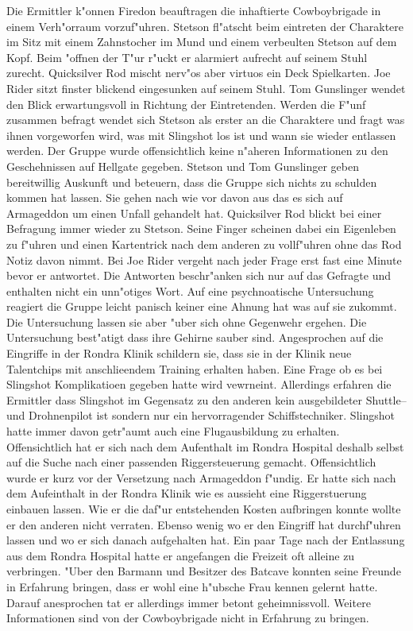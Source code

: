 
Die Ermittler k"onnen Firedon beauftragen die inhaftierte Cowboybrigade in einem Verh"orraum vorzuf"uhren. Stetson fl"atscht beim eintreten der Charaktere im Sitz mit einem Zahnstocher im Mund und einem verbeulten Stetson auf dem Kopf. Beim "offnen der T"ur r"uckt er alarmiert aufrecht auf seinem Stuhl zurecht. Quicksilver Rod mischt nerv"os aber virtuos ein Deck Spielkarten. Joe Rider sitzt finster blickend eingesunken auf seinem Stuhl. Tom Gunslinger wendet den Blick erwartungsvoll in Richtung der Eintretenden. Werden die F"unf zusammen befragt wendet sich Stetson als erster an die Charaktere und fragt was ihnen vorgeworfen wird, was mit Slingshot los ist und wann sie wieder entlassen werden. Der Gruppe wurde offensichtlich keine n"aheren Informationen zu den Geschehnissen auf Hellgate gegeben. Stetson und Tom Gunslinger geben bereitwillig Auskunft und beteuern, dass die Gruppe sich nichts zu schulden kommen hat lassen. Sie gehen nach wie vor davon aus das es sich auf Armageddon um einen Unfall gehandelt hat. Quicksilver Rod blickt bei einer Befragung immer wieder zu Stetson. Seine Finger scheinen dabei ein Eigenleben zu f"uhren und einen Kartentrick nach dem anderen zu vollf"uhren ohne das Rod Notiz davon nimmt. Bei Joe Rider vergeht nach jeder Frage erst fast eine Minute bevor er antwortet. Die Antworten beschr"anken sich nur auf das Gefragte und enthalten nicht ein unn"otiges Wort. Auf eine psychnoatische Untersuchung reagiert die Gruppe leicht panisch keiner eine Ahnung hat was auf sie zukommt. Die Untersuchung lassen sie aber "uber sich ohne Gegenwehr ergehen. Die Untersuchung best"atigt dass ihre Gehirne sauber sind. Angesprochen auf die Eingriffe in der Rondra Klinik schildern sie, dass sie in der Klinik neue Talentchips mit anschlie\3endem Training erhalten haben. Eine Frage ob es bei Slingshot Komplikatioen gegeben hatte wird vewrneint. Allerdings erfahren die Ermittler dass Slingshot im Gegensatz zu den anderen kein ausgebildeter Shuttle-- und Drohnenpilot ist sondern nur ein hervorragender Schiffstechniker. Slingshot hatte immer davon getr"aumt auch eine Flugausbildung zu erhalten. Offensichtlich hat er sich nach dem Aufenthalt im Rondra Hospital deshalb selbst auf die Suche nach einer passenden Riggersteuerung gemacht. Offensichtlich wurde er kurz vor der Versetzung nach Armageddon f"undig. Er hatte sich nach dem Aufeinthalt in der Rondra Klinik wie es aussieht eine Riggerstuerung einbauen lassen. Wie er die daf"ur entstehenden Kosten aufbringen konnte wollte er den anderen nicht verraten. Ebenso wenig wo er den Eingriff hat durchf"uhren lassen und wo er sich danach aufgehalten hat. Ein paar Tage nach der Entlassung aus dem Rondra Hospital hatte er angefangen die Freizeit oft alleine zu verbringen. "Uber den Barmann und Besitzer des Batcave konnten seine Freunde in Erfahrung bringen, dass er wohl eine h"ubsche Frau kennen gelernt hatte. Darauf anesprochen tat er allerdings immer betont geheimnissvoll. Weitere Informationen sind von der Cowboybrigade  nicht in Erfahrung zu bringen.

